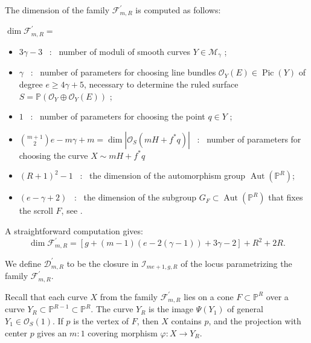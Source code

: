 \documentclass[a4paper,12pt]{amsart}
\def\dim{\operatorname{dim}}
\def\Pic{\operatorname{Pic}}%
\def\Aut{\operatorname{Aut}}%
\begin{document}
The dimension of the family $\mathcal{F}^{\prime}_{m,R}$ is computed as follows:

\noindent $\dim \mathcal{F}^{\prime}_{m,R} = $
\begin{itemize}[font=\sffamily, leftmargin=1.3cm, style=nextline]
     \item[$ + $] $3\gamma - 3$ \ : \ number of moduli of smooth curves $Y \in \mathcal{M}_{ \gamma }$ ;

     \item[$ + $] $\gamma$ \ : \ number of parameters for choosing line bundles $\mathcal{O}_{Y} (E) \in \Pic (Y)$ of degree $e \geq 4\gamma + 5$, necessary to determine the ruled surface $S = \mathbb{P} (\mathcal{O}_{Y} \oplus \mathcal{O}_{Y} (E))$ ;

     \item[$ + $] $1$  \ : \ number of parameters for choosing the point $q \in Y$ ;

     \item[$ + $] $\binom{m+1}{2}e - m\gamma + m = \dim |\mathcal{O}_S (mH + f^{\ast}q)|$ \ : \ number of parameters for choosing the curve  $X \sim mH + f^{\ast}q$

     \item[$ + $] $(R+1)^2 - 1$ \ : \ the dimension of the automorphism group $\Aut(\mathbb{P}^R)$;

     \item[$ - $] $(e- \gamma + 2)$ \ : \ the dimension of the subgroup $G_F \subset \Aut(\mathbb{P}^R)$ that fixes the scroll $F$, see \cite[Lemma~6.4, p.~148]{CCFM2009}.
\end{itemize}
A straightforward computation gives:
\begin{equation*}\label{Sec4_DimFprmR}
 \dim \mathcal{F}^{\prime}_{m,R} = \left[ g+(m-1)(e-2(\gamma - 1)) + 3\gamma - 2 \right] + R^2 + 2R .
\end{equation*}

We define $\mathcal{D}^{\prime}_{m,R}$ to be the closure in $\mathcal{I}_{me+1, g, R}$ of the locus parametrizing the family $\mathcal{F}^{\prime}_{m,R}$.

Recall that each curve $X$ from the family $\mathcal{F}^{\prime}_{m,R}$ lies on a cone $F \subset \mathbb{P}^{R}$ over a curve $Y_R \subset \mathbb{P}^{R-1} \subset \mathbb{P}^{R}$. The curve $Y_R$ is the image $\Psi (Y_1)$ of general $Y_1 \in \mathcal{O}_S (1)$. If $p$ is the vertex of $F$, then $X$ contains $p$, and the projection with center $p$ gives an $m:1$ covering morphism $\varphi : X \to Y_R$.
\end{document}
